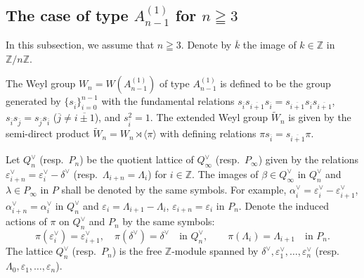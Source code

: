 \documentclass[12pt,twoside]{article}
\newcommand\tW{{\widetilde W}}
\newcommand\av{\alpha^\vee}
\newcommand\eps{\varepsilon}
\newcommand\epsv{\eps^\vee}
\newcommand\deltav{\delta^\vee}
\newcommand\Qv{Q^\vee}
\newcommand\bra{\langle}
\newcommand\ket{\rangle}
\newcommand\Z{{\mathbb Z}} %
\theoremstyle{plain} %
\theoremstyle{definition} %
\theoremstyle{definition} %
\numberwithin{theorem}{section}
\numberwithin{equation}{section}
\numberwithin{figure}{section}
\numberwithin{table}{section}
\begin{document}

\subsection{The case of type $A^{(1)}_{n-1}$ for $n\geqq 3$}
\label{sec:A^{(1)}_{n-1}}

In this subsection, we assume that $n\geqq 3$.
Denote by $\overline k$ the image of $k\in\Z$ in $\Z/n\Z$.

The Weyl group $W_n=W(A^{(1)}_{n-1})$ of type $A^{(1)}_{n-1}$ is defined to be
the group generated by $\{s_{\overline{i}}\}_{i=0}^{n-1}$
with the fundamental relations
\(
  s_{\overline{i}}s_{\overline{i+1}}s_{\overline{i}}
= s_{\overline{i+1}}s_{\overline{i}}s_{\overline{i+1}}
\), \(
  s_{\overline{i}}s_{\overline{j}}
= s_{\overline{j}}s_{\overline{i}}
\) ($\overline{j}\ne\overline{i\pm1}$), and
$s_{\overline{i}}^2 = 1$.
The extended Weyl group $\tW_n$ is given by the semi-direct
product $\tW_n=W_n\rtimes\bra\pi\ket$ with defining relations
$\pi s_{\overline{i}} = s_{\overline{i+1}} \pi$.

Let $\Qv_n$ (resp.\ $P_n$) be the quotient lattice 
of $\Qv_\infty$ (resp.\ $P_\infty$)
given by the relations $\epsv_{i+n}=\epsv_i-\deltav$
(resp.\ $\Lambda_{i+n}=\Lambda_i$) for $i\in\Z$.
The images of $\beta\in\Qv_\infty$ in $\Qv_n$ 
and $\lambda\in P_\infty$ in $P$ 
shall be denoted by the same symbols.
For example, $\av_i = \epsv_i - \epsv_{i+1}$, $\av_{i+n}=\av_i$ in $\Qv_n$ 
and $\eps_i = \Lambda_{i+1}-\Lambda_i$, $\eps_{i+n}=\eps_i$ in $P_n$.
Denote the induced actions of $\pi$ on $\Qv_n$ and $P_n$ by the same symbols:
\begin{equation*}
 \pi(\epsv_i) = \epsv_{i+1}, \quad
 \pi(\deltav) = \deltav
 \quad \text{in $\Qv_n$}, \qquad
 \pi(\Lambda_i) = \Lambda_{i+1}
 \quad \text{in $P_n$}.
\end{equation*}
The lattice $\Qv_n$ (resp.\ $P_n$) is the free $\Z$-module
spanned by $\deltav,\epsv_1,\ldots,\epsv_n$
(resp.\ $\Lambda_0,\eps_1,\ldots,\eps_n$).
\end{document}
